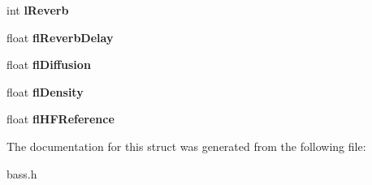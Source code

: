 \begin{DoxyCompactItemize}
\item 
\hypertarget{structBASS__DX8__I3DL2REVERB_abb5ecb3324ef2baf89a705b7ea2e2b11}{}int {\bfseries l\+Reverb}\label{structBASS__DX8__I3DL2REVERB_abb5ecb3324ef2baf89a705b7ea2e2b11}

\item 
\hypertarget{structBASS__DX8__I3DL2REVERB_a6b4b4d42d466a042dcce95a9b6ffc75a}{}float {\bfseries fl\+Reverb\+Delay}\label{structBASS__DX8__I3DL2REVERB_a6b4b4d42d466a042dcce95a9b6ffc75a}

\item 
\hypertarget{structBASS__DX8__I3DL2REVERB_a68c326cead487bc08eb060ff0492029a}{}float {\bfseries fl\+Diffusion}\label{structBASS__DX8__I3DL2REVERB_a68c326cead487bc08eb060ff0492029a}

\item 
\hypertarget{structBASS__DX8__I3DL2REVERB_a74924c051e337eabbe439bea2e4cfb15}{}float {\bfseries fl\+Density}\label{structBASS__DX8__I3DL2REVERB_a74924c051e337eabbe439bea2e4cfb15}

\item 
\hypertarget{structBASS__DX8__I3DL2REVERB_a3074421854b36b937c7d4cb22606fc9d}{}float {\bfseries fl\+H\+F\+Reference}\label{structBASS__DX8__I3DL2REVERB_a3074421854b36b937c7d4cb22606fc9d}

\end{DoxyCompactItemize}


The documentation for this struct was generated from the following file\+:\begin{DoxyCompactItemize}
\item 
bass.\+h\end{DoxyCompactItemize}
